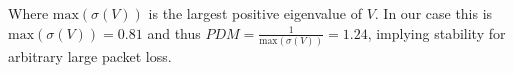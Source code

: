 Where $\text{max}(\sigma(V))$ is the largest positive eigenvalue of $V$. In our case this is $\text{max}(\sigma(V)) = 0.81$ and thus $PDM = \frac{1}{\text{max}(\sigma(V))} = 1.24$, implying stability for arbitrary large packet loss.






